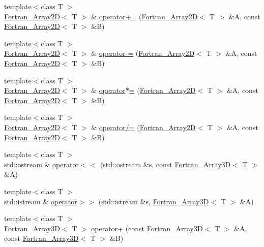 \begin{DoxyCompactItemize}
\item 
{\footnotesize template$<$class T $>$ }\\\hyperlink{classTNT_1_1Fortran__Array2D}{Fortran\-\_\-\-Array2\-D}$<$ T $>$ \& \hyperlink{namespaceTNT_abf1054e1d50ab544cfb84d53598c4099}{operator+=} (\hyperlink{classTNT_1_1Fortran__Array2D}{Fortran\-\_\-\-Array2\-D}$<$ T $>$ \&A, const \hyperlink{classTNT_1_1Fortran__Array2D}{Fortran\-\_\-\-Array2\-D}$<$ T $>$ \&B)
\item 
{\footnotesize template$<$class T $>$ }\\\hyperlink{classTNT_1_1Fortran__Array2D}{Fortran\-\_\-\-Array2\-D}$<$ T $>$ \& \hyperlink{namespaceTNT_af6150ea38afd7644250d5cf739462af0}{operator-\/=} (\hyperlink{classTNT_1_1Fortran__Array2D}{Fortran\-\_\-\-Array2\-D}$<$ T $>$ \&A, const \hyperlink{classTNT_1_1Fortran__Array2D}{Fortran\-\_\-\-Array2\-D}$<$ T $>$ \&B)
\item 
{\footnotesize template$<$class T $>$ }\\\hyperlink{classTNT_1_1Fortran__Array2D}{Fortran\-\_\-\-Array2\-D}$<$ T $>$ \& \hyperlink{namespaceTNT_a383a5db478d4a5d28169b06dfe3bbd96}{operator$\ast$=} (\hyperlink{classTNT_1_1Fortran__Array2D}{Fortran\-\_\-\-Array2\-D}$<$ T $>$ \&A, const \hyperlink{classTNT_1_1Fortran__Array2D}{Fortran\-\_\-\-Array2\-D}$<$ T $>$ \&B)
\item 
{\footnotesize template$<$class T $>$ }\\\hyperlink{classTNT_1_1Fortran__Array2D}{Fortran\-\_\-\-Array2\-D}$<$ T $>$ \& \hyperlink{namespaceTNT_ad8d57784747776274490334a387b5eb4}{operator/=} (\hyperlink{classTNT_1_1Fortran__Array2D}{Fortran\-\_\-\-Array2\-D}$<$ T $>$ \&A, const \hyperlink{classTNT_1_1Fortran__Array2D}{Fortran\-\_\-\-Array2\-D}$<$ T $>$ \&B)
\item 
{\footnotesize template$<$class T $>$ }\\std\-::ostream \& \hyperlink{namespaceTNT_a655b76bc5ba826ec55aebe56429c0d9c}{operator$<$$<$} (std\-::ostream \&s, const \hyperlink{classTNT_1_1Fortran__Array3D}{Fortran\-\_\-\-Array3\-D}$<$ T $>$ \&A)
\item 
{\footnotesize template$<$class T $>$ }\\std\-::istream \& \hyperlink{namespaceTNT_afe6ad6c1db12c3e36ef2fc56089d3878}{operator$>$$>$} (std\-::istream \&s, \hyperlink{classTNT_1_1Fortran__Array3D}{Fortran\-\_\-\-Array3\-D}$<$ T $>$ \&A)
\item 
{\footnotesize template$<$class T $>$ }\\\hyperlink{classTNT_1_1Fortran__Array3D}{Fortran\-\_\-\-Array3\-D}$<$ T $>$ \hyperlink{namespaceTNT_a7eb3cb2c72a4a811c26855a69d92ecfd}{operator+} (const \hyperlink{classTNT_1_1Fortran__Array3D}{Fortran\-\_\-\-Array3\-D}$<$ T $>$ \&A, const \hyperlink{classTNT_1_1Fortran__Array3D}{Fortran\-\_\-\-Array3\-D}$<$ T $>$ \&B)

\end{DoxyCompactItemize}

